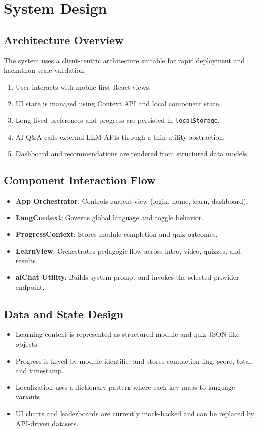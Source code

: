 \documentclass[12pt,a4paper]{article}
\begin{document}
\section{System Design}
\subsection{Architecture Overview}
The system uses a client-centric architecture suitable for rapid deployment and hackathon-scale validation:
\begin{enumerate}[leftmargin=*]
\item User interacts with mobile-first React views.
\item UI state is managed using Context API and local component state.
\item Long-lived preferences and progress are persisted in \texttt{localStorage}.
\item AI Q\&A calls external LLM APIs through a thin utility abstraction.
\item Dashboard and recommendations are rendered from structured data models.
\end{enumerate}

\subsection{Component Interaction Flow}
\begin{itemize}[leftmargin=*]
\item \textbf{App Orchestrator}: Controls current view (login, home, learn, dashboard).
\item \textbf{LangContext}: Governs global language and toggle behavior.
\item \textbf{ProgressContext}: Stores module completion and quiz outcomes.
\item \textbf{LearnView}: Orchestrates pedagogic flow across intro, video, quizzes, and results.
\item \textbf{aiChat Utility}: Builds system prompt and invokes the selected provider endpoint.
\end{itemize}

\subsection{Data and State Design}
\begin{itemize}[leftmargin=*]
\item Learning content is represented as structured module and quiz JSON-like objects.
\item Progress is keyed by module identifier and stores completion flag, score, total, and timestamp.
\item Localization uses a dictionary pattern where each key maps to language variants.
\item UI charts and leaderboards are currently mock-backed and can be replaced by API-driven datasets.
\end{itemize}
\end{document}
